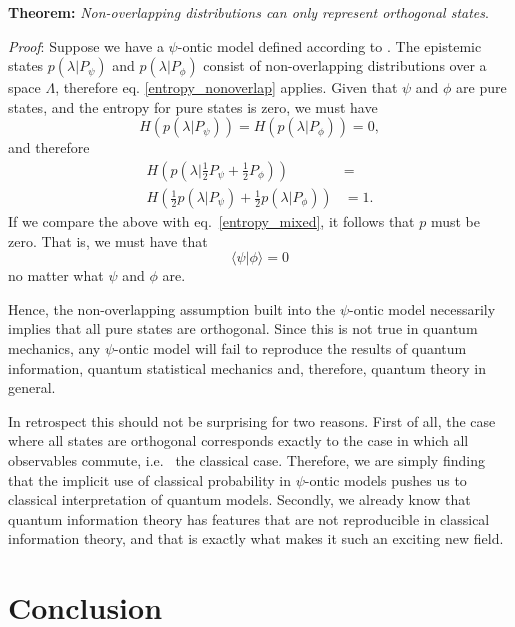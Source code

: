 \documentclass[10pt,twocolumn, nofootinbib]{revtex4-1}
\begin{document}
\textbf{Theorem:} \emph{Non-overlapping distributions can only represent orthogonal states}. 

\emph{Proof}: Suppose we have a $\psi$-ontic model defined according to \cite{Harrigan:2010}. The epistemic states $p(\lambda|P_\psi)$ and $p(\lambda|P_\phi)$ consist of non-overlapping distributions over a space $\Lambda$, therefore eq. \ref{entropy_nonoverlap} applies. Given that $\psi$ and $\phi$ are pure states, and the entropy for pure states is zero, we must have
\begin{equation}\label{entropy_pure}
	H(p(\lambda|P_\psi)) = H(p(\lambda|P_\phi)) = 0,
\end{equation}
and therefore
\begin{equation}\label{required_entropy}
	\begin{aligned}
	H\left(p(\lambda|\frac{1}{2}P_\psi + \frac{1}{2}P_\phi)\right) &= \\
H\left(\frac{1}{2}p(\lambda|P_\psi) + \frac{1}{2}p(\lambda|P_\phi)\right) 
&= 1.
	\end{aligned}
\end{equation}
If we compare the above with eq.\ \ref{entropy_mixed}, it follows that $p$ must be zero. That is, we must have that
\begin{equation}\label{orthogonal}
	 \langle \psi | \phi \rangle = 0
\end{equation}
no matter what $\psi$ and $\phi$ are.

Hence, the non-overlapping assumption built into the $\psi$-ontic model necessarily implies that all pure states are orthogonal. Since this is not true in quantum mechanics, any $\psi$-ontic model will fail to reproduce the results of quantum information, quantum statistical mechanics and, therefore, quantum theory in general.

In retrospect this should not be surprising for two reasons. First of all, the case where all states are orthogonal corresponds exactly to the case in which all observables commute, i.e.	\ the classical case. Therefore, we are simply finding that the implicit use of classical probability in $\psi$-ontic models pushes us to classical interpretation of quantum models. Secondly, we already know that quantum information theory has features that are not reproducible in classical information theory, and that is exactly what makes it such an exciting new field.


\section{Conclusion}
\end{document}
